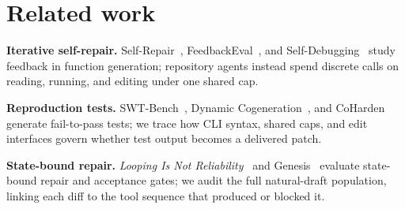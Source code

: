 \section{Related work}
\textbf{Iterative self-repair.} Self-Repair~\cite{selfrepair}, FeedbackEval~\cite{feedbackeval}, and Self-Debugging~\cite{selfdebug} study feedback in function generation; repository agents instead spend discrete calls on reading, running, and editing under one shared cap.

\textbf{Reproduction tests.} SWT-Bench~\cite{swtbench}, Dynamic Cogeneration~\cite{cogeneration}, and CoHarden~\cite{coharden} generate fail-to-pass tests; we trace how CLI syntax, shared caps, and edit interfaces govern whether test output becomes a delivered patch.

\textbf{State-bound repair.} \emph{Looping Is Not Reliability}~\cite{looping} and Genesis~\cite{genesis} evaluate state-bound repair and acceptance gates; we audit the full natural-draft population, linking each diff to the tool sequence that produced or blocked it.
